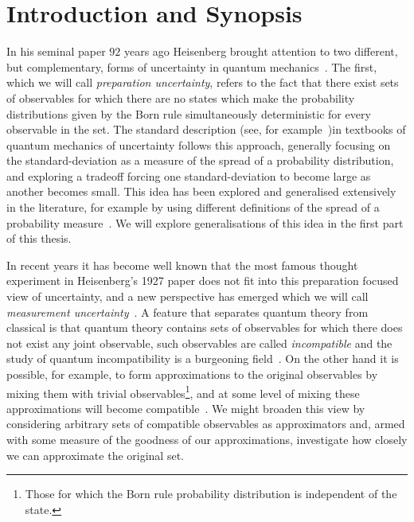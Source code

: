 \let\textcircled=\pgftextcircled
\chapter{Introduction and Synopsis}
\label{chap:intro}

In his seminal paper $92$ years ago Heisenberg brought attention to two different, but complementary, forms of uncertainty in quantum mechanics~\cite{Heisenberg1927-Wheeler+Zurek}. The first, which we will call \emph{preparation uncertainty}, refers to the fact that there exist sets of observables for which there are no states which make the probability distributions given by the Born rule simultaneously deterministic for every observable in the set. The standard description (see, for example~\cite{griffiths2005introduction})in textbooks of quantum mechanics of uncertainty follows this approach, generally focusing on the standard-deviation as a measure of the spread of a probability distribution, and exploring a tradeoff forcing one standard-deviation to become large as another becomes small. This idea has been explored and generalised extensively in the literature, for example by using different definitions of the spread of a probability measure~\cites{MaassenUffink1988}{doi:10.1063/1.3614503}{doi:10.1063/1.2759831}. We will explore generalisations of this idea in the first part of this thesis.

In recent years it has become well known that the most famous thought experiment in Heisenberg's 1927 paper does not fit into this preparation focused view of uncertainty, and a new perspective has emerged which we will call \emph{measurement uncertainty}~\cites{PhysRevLett.111.160405}{blw-meas-uncertainty}{6773660Werner:2004:URJ:2011593.2011606}. A feature that separates quantum theory from classical is that quantum theory contains sets of observables for which there does not exist any joint observable, such observables are called \emph{incompatible} and the study of quantum incompatibility is a burgeoning field~\cites{Heinosaari_2016}{PhysRevLett.122.130402}{Heinosaari_2017}{PhysRevA.96.052127}. On the other hand it is possible, for example, to form approximations to the original observables by mixing them with trivial observables\footnote{Those for which the Born rule probability distribution is independent of the state.}, and at some level of mixing these approximations will become compatible~\cite{PhysRevA.87.052125}. We might broaden this view by considering arbitrary sets of compatible observables as approximators and, armed with some measure of the goodness of our approximations, investigate how closely we can approximate the original set.


